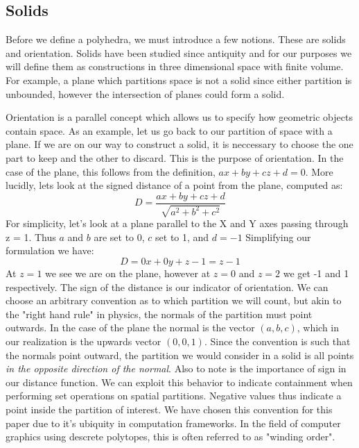 \subsection{Solids}

Before we define a polyhedra, we must introduce a few notions. These are
solids and orientation. Solids have been studied since
antiquity and for our purposes we will define them as constructions in
three dimensional space with finite volume.
For example, a plane which partitions space is not a solid
since either partition is unbounded, however the intersection of planes
could form a solid.

Orientation is a parallel concept which allows us to specify how geometric
objects contain space. As an example, let us go back to our partition of
space with a plane. If we are on our way to construct a solid, it is
neccessary to choose the one part to keep and the other to discard. This is
the purpose of orientation. In the case of the plane, this follows from the
definition, $ax+by+cz+d=0$. More lucidly, lets look at the signed distance
of a point from the plane, computed as:
\begin{equation}
D = \frac{ax+by+cz+d}{\sqrt{a^2+b^2+c^2}}
\end{equation}
For simplicity, let's look at a plane parallel to the X and Y axes passing
through z = 1. Thus $a$ and $b$ are set to 0, $c$ set to 1, and
$d=-1$
Simplifying our formulation we have:
\begin{equation}
D = 0x+0y+z-1 = z-1
\end{equation}
At $z=1$ we see we are on the plane, however at $z=0$ and $z=2$ we get -1 and 1
respectively. The sign of the distance is our indicator of orientation. We can
choose an arbitrary convention as to which partition we will count, but akin
to the "right hand rule" in physics, the normals of the partition must point
outwards. In the case of the plane the normal is the vector $(a,b,c)$, which
in our realization is the upwards vector $(0,0,1)$. Since the convention is
such that the normals point outward, the partition we would consider in a
solid is all points \emph{in the opposite direction of the normal}.
Also to note is the importance of sign in our distance function. We can exploit
this behavior to indicate containment when performing set operations on
spatial partitions. Negative values thus indicate a point inside the partition
of interest. We have chosen this convention for this paper due to
it's ubiquity in computation frameworks. In the field of computer graphics
using descrete polytopes, this is often referred to as "winding order".

